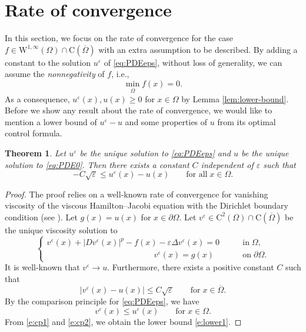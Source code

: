 \documentclass[12pt,reqno]{amsart}
\numberwithin{figure}{section}
\theoremstyle{plain}
\newtheorem{thm}{Theorem}[section]
\theoremstyle{remark}
\numberwithin{equation}{section}
\begin{document}
\section{Rate of convergence}
In this section, we focus on the rate of convergence for the case $f\in \mathrm{W}^{1,\infty}(\Omega)\cap\mathrm{C}(\overline{\Omega})$ with an extra assumption to be described. By adding a constant to the solution $u^\varepsilon$ of \eqref{eq:PDEeps}, without loss of generality, we can assume the \emph{nonnegativity} of $f$, i.e.,
\begin{equation}\label{e:minf}
    \min_{\overline{\Omega}} f(x) = 0.
\end{equation}
As a consequence, $u^\varepsilon(x),u(x)\geq 0$ for $x\in \Omega$ by Lemma \ref{lem:lower-bound}. Before we show any result about the rate of convergence, we would like to mention a lower bound of $u^\varepsilon - u$ and some properties of $u$ from its optimal control formula.
\begin{thm} Let $u^\varepsilon$ be the unique solution to \eqref{eq:PDEeps} and $u$ be the unique solution to \eqref{eq:PDE0}. Then there exists a constant $C$ independent of $\varepsilon$ such that
\begin{equation}\label{e:lower1}
    -C\sqrt{\varepsilon} \leq u^\varepsilon(x) - u(x) \qquad\text{for all}\;x\in \Omega.
\end{equation} 
\end{thm}
\begin{proof} The proof relies on a well-known rate of convergence for vanishing viscosity of the viscous Hamilton--Jacobi equation with the Dirichlet boundary condition (see \cite{crandall1984,evans_adjoint_2010,fleming_convergence_1961,Tran2011}). Let $g(x) = u(x)$ for $x\in \partial\Omega$. Let $v^\varepsilon\in \mathrm{C}^2(\Omega)\cap \mathrm{C}(\overline{\Omega})$ be the unique viscosity solution to
\begin{equation*}
    \begin{cases}
          v^\varepsilon(x) + |Dv^\varepsilon(x)|^p - f(x) - \varepsilon \Delta v^\varepsilon(x) = 0 &\qquad\text{in}\;\Omega,\\
        \qquad\qquad\qquad\qquad\qquad \qquad\quad v^\varepsilon(x) = g(x) &\qquad\text{on}\;\partial\Omega.
    \end{cases}
\end{equation*}
It is well-known that $v^\varepsilon \to u$. Furthermore, there exists a positive constant $C$ such that 
\begin{equation}\label{e:cp1}
     |v^\varepsilon(x)  - u(x)| \leq C\sqrt{\varepsilon} \qquad\text{for}\;x\in \overline{\Omega}.
\end{equation}
By the comparison principle for \eqref{eq:PDEeps}, we have
\begin{equation}\label{e:cp2}
    v^\varepsilon(x)\leq u^\varepsilon(x) \qquad\text{for}\;x\in \Omega.
\end{equation}
From \eqref{e:cp1} and \eqref{e:cp2}, we obtain the lower bound \eqref{e:lower1}.
\end{proof}
\end{document}

